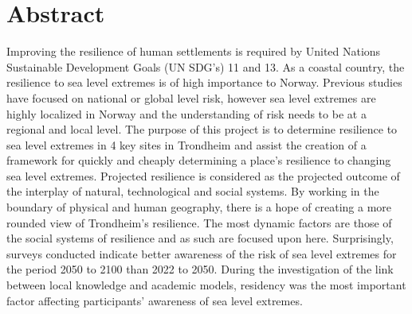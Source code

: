 

\section{Abstract}

Improving the resilience of human settlements is required by United Nations Sustainable Development Goals (UN SDG's) 11 and 13. As a coastal country, the resilience to sea level extremes is of high importance to Norway. Previous studies have focused on national or global level risk, however sea level extremes are highly localized in Norway and the understanding of risk needs to be at a regional and local level. The purpose of this project is to determine resilience to sea level extremes in 4 key sites in Trondheim and assist the creation of a framework for quickly and cheaply determining a place's resilience to changing sea level extremes. Projected resilience is considered as the projected outcome of the interplay of natural, technological and social systems. By working in the boundary of physical and human geography, there is a hope of creating a more rounded view of Trondheim's resilience. The most dynamic factors are those of the social systems of resilience and as such are focused upon here. Surprisingly, surveys conducted indicate better awareness of the risk of sea level extremes for the period 2050 to 2100 than 2022 to 2050. During the investigation of the link between local knowledge and academic models, residency was the most important factor affecting participants' awareness of sea level extremes.   

\newpage

